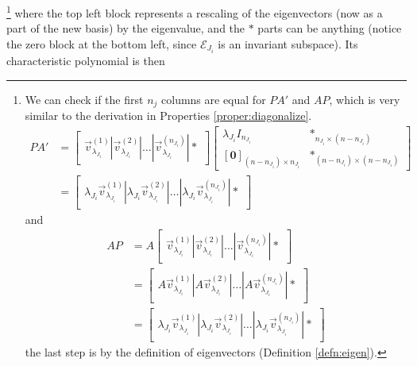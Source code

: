 \footnote{We can check if the first $n_j$ columns are equal for $PA'$ and $AP$, which is very similar to the derivation in Properties \ref{proper:diagonalize}.
\begin{align*}
PA' &= \begin{bmatrix}
\vec{v}_{\lambda_{J_i}}^{(1)}|\vec{v}_{\lambda_{J_i}}^{(2)}|\ldots|\vec{v}_{\lambda_{J_i}}^{(n_{J_i})}|*
\end{bmatrix}
\begin{bmatrix}
\lambda_{J_i} I_{n_{J_i}} & *_{n_{J_i}\times(n-n_{J_i})} \\
[\textbf{0}]_{(n-n_{J_i})\times n_{J_i}} & *_{(n-n_{J_i})\times(n-n_{J_i})}
\end{bmatrix} \\
&=
\begin{bmatrix}
\lambda_{J_i}\vec{v}_{\lambda_{J_i}}^{(1)}|\lambda_{J_i}\vec{v}_{\lambda_{J_i}}^{(2)}|\ldots|\lambda_{J_i}\vec{v}_{\lambda_{J_i}}^{(n_{J_i})}|*
\end{bmatrix}
\end{align*} and
\begin{align*}
AP &= A\begin{bmatrix}
\vec{v}_{\lambda_{J_i}}^{(1)}|\vec{v}_{\lambda_{J_i}}^{(2)}|\ldots|\vec{v}_{\lambda_{J_i}}^{(n_{J_i})}|*
\end{bmatrix} \\
&= 
\begin{bmatrix}
A\vec{v}_{\lambda_{J_i}}^{(1)}|A\vec{v}_{\lambda_{J_i}}^{(2)}|\ldots|A\vec{v}_{\lambda_{J_i}}^{(n_{J_i})}|*
\end{bmatrix} \\
&= \begin{bmatrix}
\lambda_{J_i}\vec{v}_{\lambda_{J_i}}^{(1)}|\lambda_{J_i}\vec{v}_{\lambda_{J_i}}^{(2)}|\ldots|\lambda_{J_i}\vec{v}_{\lambda_{J_i}}^{(n_{J_i})}|*
\end{bmatrix}
\end{align*}
the last step is by the definition of eigenvectors (Definition \ref{defn:eigen}).} where the top left block represents a rescaling of the eigenvectors (now as a part of the new basis) by the eigenvalue, and the $*$ parts can be anything (notice the zero block at the bottom left, since $\mathcal{E}_{J_i}$ is an invariant subspace). Its characteristic polynomial is then 
